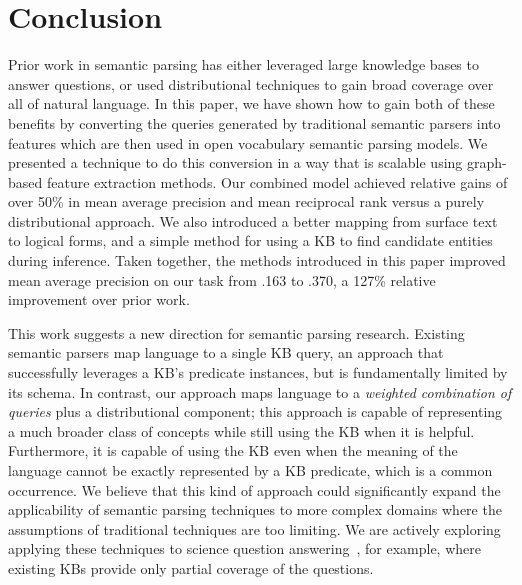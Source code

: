 \documentclass[11pt,letterpaper]{article}
\begin{document}
\section{Conclusion}
\label{sec:conclusion}

Prior work in semantic parsing has either leveraged large knowledge bases to answer questions, or
used distributional techniques to gain broad coverage over all of natural language.  In this paper,
we have shown how to gain both of these benefits by converting the queries generated by traditional
semantic parsers into features which are then used in open vocabulary semantic parsing models.  We
presented a technique to do this conversion in a way that is scalable using graph-based feature
extraction methods.  Our combined model achieved relative gains of over 50\% in mean average
precision and mean reciprocal rank versus a purely distributional approach.  We also introduced a
better mapping from surface text to logical forms, and a simple method for using a KB to find
candidate entities during inference.  Taken together, the methods introduced in this paper improved
mean average precision on our task from .163 to .370, a 127\% relative improvement over prior work.

This work suggests a new direction for semantic parsing research.  Existing semantic parsers map
language to a single KB query, an approach that successfully leverages a KB's predicate instances,
but is fundamentally limited by its schema. In contrast, our approach maps language to a
\emph{weighted combination of queries} plus a distributional component; this approach is capable of
representing a much broader class of concepts while still using the KB when it is helpful.
Furthermore, it is capable of using the KB even when the meaning of the language cannot be exactly
represented by a KB predicate, which is a common occurrence. We believe that this kind of approach
could significantly expand the applicability of semantic parsing techniques to more complex domains
where the assumptions of traditional techniques are too limiting.  We are actively exploring
applying these techniques to science question answering~\cite{clark-2013-kb-requirements-for-qa},
for example, where existing KBs provide only partial coverage of the questions.
\end{document}
